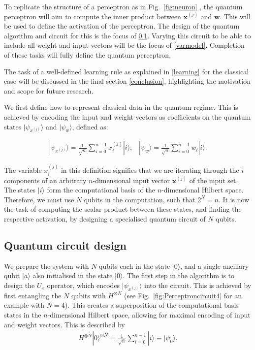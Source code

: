 \documentclass[twocolumn,superscriptaddress]{revtex4-1}
\begin{document}
To replicate the structure of a perceptron as in Fig.~\ref{fig:neuron} , the quantum perceptron will aim to compute the inner product between $\bm{x}^{(j)}$ and $\bm{w}$. This will be used to define the activation of the perceptron. The design of the quantum algorithm and circuit for this is the focus of \ref{qpcircuit}. Varying this circuit to be able to include all weight and input vectors will be the focus of \ref{varmodel}. Completion of these tasks will fully define the quantum perceptron.
 
The task of a well-defined learning rule as explained in \ref{learning} for the classical case will be discussed in the final section \ref{conclusion}, highlighting the motivation and scope for future research.

We first define how to represent classical data in the quantum regime. This is achieved by encoding the input and weight vectors as coefficients on the quantum states $ |{\psi}_{x^{(j)}} \rangle$ and $ |{\psi}_w \rangle$, defined as: 

\begin{equation} \label{eq:inputweight}
\begin{split}
|{\psi}_{x^{(j)}} \rangle = \frac{1}{\sqrt{n}} \sum_{i=0}^{n-1} x^{(j)}_i |i \rangle ; \hspace{10pt} |{\psi}_w \rangle = \frac{1}{\sqrt{n}} \sum_{i=0}^{n-1} w_i |i \rangle .
\end{split}
\end{equation}

The variable $x^{(j)}_i $ in this definition signifies that we are iterating through the $i$ components of an arbitrary $n$-dimensional input vector $\bm{x}^{(j)}$ of the input set. The states $|i \rangle$ form the computational basis of the $n$-dimensional Hilbert space. Therefore, we must use $N$ qubits in the computation, such that $2^N = n$. It is now the task of computing the scalar product between these states, and finding the respective activation, by designing a specialised quantum circuit of $N$ qubits.

\subsection{Quantum circuit design} \label{qpcircuit}

We prepare the system with $N$ qubits each in the state $|0 \rangle$, and a single ancillary qubit $|a \rangle$ also initialised in the state $|0 \rangle$. The first step in the algorithm is to design the $U_x$ operator, which encodes $ |{\psi}_{x^{(j)}} \rangle$ into the circuit. This is achieved by first entangling the $N$ qubits with $H^{\otimes N}$ (see Fig.~\ref{fig:Perceptroncircuit4} for an example with $N=4$). This creates a superposition of the computational basis states in the $n$-dimensional Hilbert space, allowing for maximal encoding of input and weight vectors. This is described by 
\begin{equation} \label{eq:compbasis}
\begin{split}
H^{\otimes N} |0 \rangle ^{\otimes N} = \frac{1}{\sqrt{n}} \sum_{i=0}^{n-1} |i \rangle \equiv | \psi_0 \rangle .
\end{split}
\end{equation}
\end{document}
